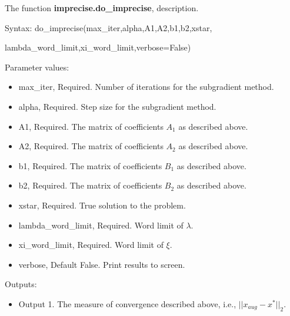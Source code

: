 \documentclass[12pt]{article}
\begin{document}
\noindent The function \textbf{imprecise.do\_imprecise}, description.

Syntax: do\_imprecise(max\_iter,alpha,A1,A2,b1,b2,xstar,

\qquad\qquad\qquad\qquad lambda\_word\_limit,xi\_word\_limit,verbose=False)

Parameter values:
\begin{itemize}
	\item max\_iter, Required. Number of iterations for the subgradient method.
	\item alpha, Required. Step size for the subgradient method.
	\item A1, Required. The matrix of coefficients $A_1$ as described above.
	\item A2, Required. The matrix of coefficients $A_2$ as described above.
	\item b1, Required. The matrix of coefficients $B_1$ as described above.
	\item b2, Required. The matrix of coefficients $B_2$ as described above.
	\item xstar, Required. True solution to the problem.
	\item lambda\_word\_limit, Required. Word limit of $\lambda$.
	\item xi\_word\_limit, Required. Word limit of $\xi$.
	\item verbose, Default False. Print results to screen.
\end{itemize}

Outputs:
\begin{itemize}
	\item Output 1. The measure of convergence described above, i.e., $||x_{aug}-x^*||_2$.
\end{itemize}
\end{document}
